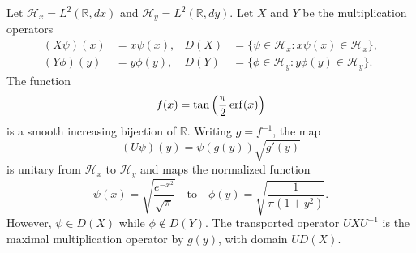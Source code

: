 \documentclass{techbrief}
\begin{document}
\begin{prop}\label{coordinateExample}
	Let $\mathcal{H}_x=L^2(\mathbb{R},dx)$ and
	$\mathcal{H}_y=L^2(\mathbb{R},dy)$. Let $X$ and $Y$ be
	the multiplication operators
	\begin{equation*}
		\begin{aligned}
			(X\psi)(x)&=x\psi(x),
			& D(X)&=\{\psi\in\mathcal{H}_x:x\psi(x)\in\mathcal{H}_x\},\\
			(Y\phi)(y)&=y\phi(y),
			& D(Y)&=\{\phi\in\mathcal{H}_y:y\phi(y)\in\mathcal{H}_y\}.
		\end{aligned}
	\end{equation*}
	The function
	\begin{equation*}
		f(x)=\tan\left(\frac{\pi}{2}\operatorname{erf}(x)\right)
	\end{equation*}
	is a smooth increasing bijection of $\mathbb{R}$. Writing
	$g=f^{-1}$, the map
	\begin{equation*}
		(U\psi)(y)=\psi(g(y))\sqrt{g'(y)}
	\end{equation*}
	is unitary from $\mathcal{H}_x$ to $\mathcal{H}_y$ and maps
	the normalized function
	\begin{equation*}
		\psi(x)=\sqrt{\frac{e^{-x^2}}{\sqrt{\pi}}}
		\quad\text{to}\quad
		\phi(y)=\sqrt{\frac{1}{\pi(1+y^2)}}.
	\end{equation*}
	However, $\psi\in D(X)$ while $\phi\notin D(Y)$.
	The transported operator $UXU^{-1}$ is the maximal
	multiplication operator by $g(y)$, with domain $UD(X)$.
\end{prop}
\end{document}
